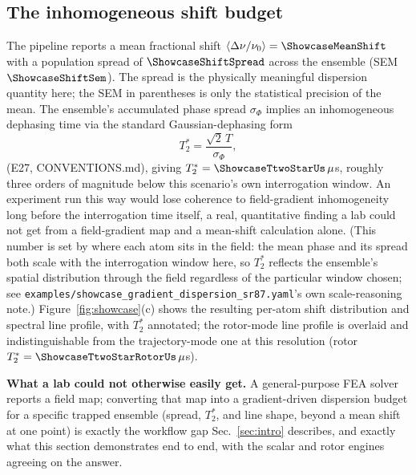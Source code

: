 \documentclass[aps,pra,superscriptaddress,groupedaddress,nofootinbib]{revtex4-2}
\begin{document}
\subsection{The inhomogeneous shift budget}

The pipeline reports a mean fractional shift
$\langle\Delta\nu/\nu_0\rangle=\ShowcaseMeanShift$ with a population
spread of $\ShowcaseShiftSpread$ across the ensemble (SEM
$\ShowcaseShiftSem$). The spread is the physically meaningful
dispersion quantity here; the SEM in parentheses is only the
statistical precision of the mean. The ensemble's accumulated phase spread $\sigma_\Phi$ implies
an inhomogeneous dephasing time via the standard Gaussian-dephasing form
\begin{equation}
  T_2^* = \frac{\sqrt{2}\,T}{\sigma_\Phi} ,
  \label{eq:e27}
\end{equation}
(E27, CONVENTIONS.md), giving
$T_2^*=\ShowcaseTtwoStarUs\,\mu$s, roughly three orders of magnitude
below this scenario's own interrogation window. An experiment run this
way would lose coherence to field-gradient inhomogeneity long before
the interrogation time itself, a real, quantitative finding a lab could
not get from a field-gradient map and a mean-shift calculation alone.
(This number is set by where each atom sits in the field: the mean
phase and its spread both scale with the interrogation window here, so
$T_2^*$ reflects the ensemble's spatial distribution through the field
regardless of the particular window chosen; see
\texttt{examples/showcase\_gradient\_dispersion\_sr87.yaml}'s
own scale-reasoning note.) Figure~\ref{fig:showcase}(c) shows the
resulting per-atom shift distribution and spectral line profile, with
$T_2^*$ annotated; the rotor-mode line profile is overlaid and
indistinguishable from the trajectory-mode one at this resolution
(rotor $T_2^*=\ShowcaseTtwoStarRotorUs\,\mu$s).

\textbf{What a lab could not otherwise easily get.} A general-purpose
FEA solver reports a field map; converting that map into a
gradient-driven dispersion budget for a specific trapped ensemble
(spread, $T_2^*$, and line shape, beyond a mean shift at one point) is
exactly the workflow gap Sec.~\ref{sec:intro} describes, and exactly what
this section demonstrates end to end, with the scalar and rotor engines
agreeing on the answer.
\end{document}
